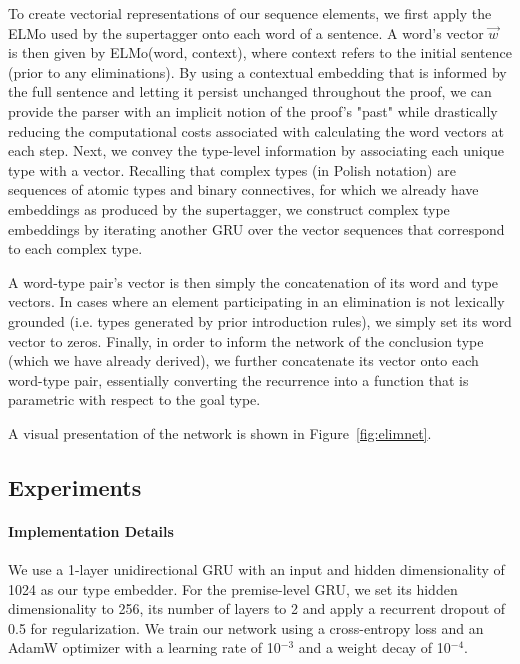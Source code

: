 To create vectorial representations of our sequence elements, we first apply the ELMo used by the supertagger onto each word of a sentence.
A word's vector $\overrightarrow{w}$ is then given by ELMo(word, context), where context refers to the initial sentence (prior to any eliminations).
By using a contextual embedding that is informed by the full sentence and letting it persist unchanged throughout the proof, we can provide the parser with an implicit notion of the proof's "past" while drastically reducing the computational costs associated with calculating the word vectors at each step.
Next, we convey the type-level information by associating each unique type with a vector.
Recalling that complex types (in Polish notation) are sequences of atomic types and binary connectives, for which we already have embeddings as produced by the supertagger, we construct complex type embeddings by iterating another GRU over the vector sequences that correspond to each complex type.

A word-type pair's vector is then simply the concatenation of its word and type vectors.
In cases where an element participating in an elimination is not lexically grounded (i.e. types generated by prior introduction rules), we simply set its word vector to zeros.
Finally, in order to inform the network of the conclusion type (which we have already derived), we further concatenate its vector onto each word-type pair, essentially converting the recurrence into a function that is parametric with respect to the goal type.

A visual presentation of the network is shown in Figure~\ref{fig:elimnet}.

\subsection{Experiments}
\paragraph{Implementation Details}
We use a 1-layer unidirectional GRU with an input and hidden dimensionality of 1024 as our type embedder.
For the premise-level GRU, we set its hidden dimensionality to 256, its number of layers to 2 and apply a recurrent dropout of 0.5 for regularization.
We train our network using a cross-entropy loss and an AdamW optimizer \cite{adamW} with a learning rate of 10${}^{-3}$ and a weight decay of 10${}^{-4}$.

